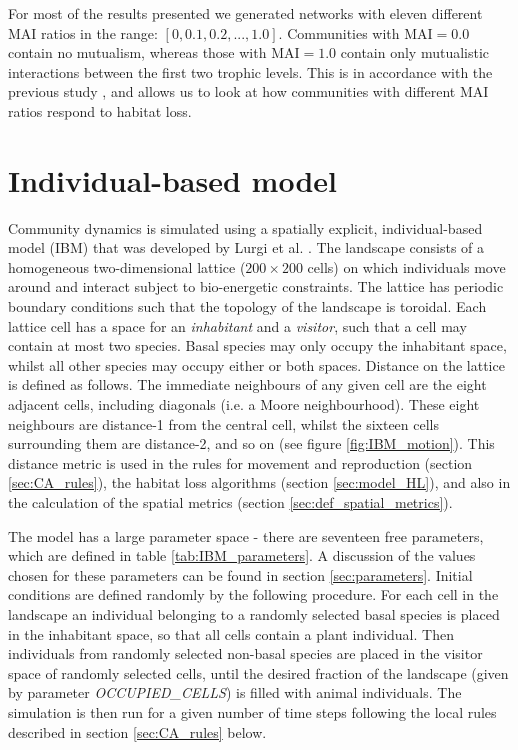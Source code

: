 For most of the results presented we generated networks with eleven different MAI ratios in the range: $[0,0.1,0.2,...,1.0]$. Communities with MAI$=0.0$ contain no mutualism, whereas those with MAI$=1.0$ contain only mutualistic interactions between the first two trophic levels. This is in accordance with the previous study \cite{lurgi2015effects}, and allows us to look at how communities with different MAI ratios respond to habitat loss. 


\section{Individual-based model}
\label{sec:the_model}


Community dynamics is simulated using a spatially explicit, individual-based model (IBM) that was developed by Lurgi et al. \cite{lurgi2015effects}. The landscape consists of a homogeneous two-dimensional lattice ($200 \times 200$ cells) on which individuals move around and interact subject to bio-energetic constraints. The lattice has periodic boundary conditions such that the topology of the landscape is toroidal. Each lattice cell has a space for an \emph{inhabitant} and a \emph{visitor}, such that a cell may contain at most two species. Basal species may only occupy the inhabitant space, whilst all other species may occupy either or both spaces. Distance on the lattice is defined as follows. The immediate neighbours of any given cell are the eight adjacent cells, including diagonals (i.e. a Moore neighbourhood). These eight neighbours are distance-1 from the central cell, whilst the sixteen cells surrounding them are distance-2, and so on (see figure \ref{fig:IBM_motion}). This distance metric is used in the rules for movement and reproduction (section \ref{sec:CA_rules}), the habitat loss algorithms (section \ref{sec:model_HL}), and also in the calculation of the spatial metrics (section \ref{sec:def_spatial_metrics}).




The model has a large parameter space - there are seventeen free parameters, which are defined in table \ref{tab:IBM_parameters}. A discussion of the values chosen for these parameters can be found in section \ref{sec:parameters}. Initial conditions are defined randomly by the following procedure. For each cell in the landscape an individual belonging to a randomly selected basal species is placed in the inhabitant space, so that all cells contain a plant individual. Then individuals from randomly selected non-basal species are placed in the visitor space of randomly selected cells, until the desired fraction of the landscape (given by parameter \emph{OCCUPIED\_CELLS}) is filled with animal individuals. The simulation is then run for a given number of time steps following the local rules described in section \ref{sec:CA_rules} below.

